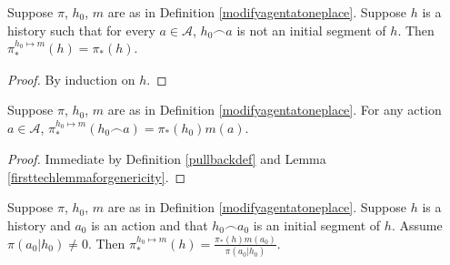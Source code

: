 \documentclass[runningheads]{llncs}
\begin{document}
\begin{lemma}
\label{firsttechlemmaforgenericity}
    Suppose $\pi$, $h_0$, $m$ are as in Definition \ref{modifyagentatoneplace}.
    Suppose $h$ is a history such that
    for every $a\in\mathcal A$,
    $h_0\frown a$ is not an initial segment of $h$.
    Then $\pi^{h_0\mapsto m}_*(h)=\pi_*(h)$.
\end{lemma}

\begin{proof}
    By induction on $h$.
\end{proof}

\begin{lemma}
\label{thirdtechlemmaforgenericity}
    Suppose $\pi$, $h_0$, $m$ are as in Definition \ref{modifyagentatoneplace}.
    For any action $a\in\mathcal A$,
    $\pi^{h_0\mapsto m}_*(h_0\frown a)=\pi_*(h_0)m(a)$.
\end{lemma}

\begin{proof}
    Immediate by Definition \ref{pullbackdef} and Lemma \ref{firsttechlemmaforgenericity}.
\end{proof}

\begin{lemma}
\label{secondtechlemmaforgenericity}
    Suppose $\pi$, $h_0$, $m$ are as in Definition \ref{modifyagentatoneplace}.
    Suppose $h$ is a history and $a_0$ is an action and that $h_0\frown a_0$ is
    an initial segment of $h$. Assume $\pi(a_0|h_0)\not=0$. Then
    $\pi^{h_0\mapsto m}_*(h) = \frac{\pi_*(h)m(a_0)}{\pi(a_0|h_0)}$.
\end{lemma}
\end{document}

